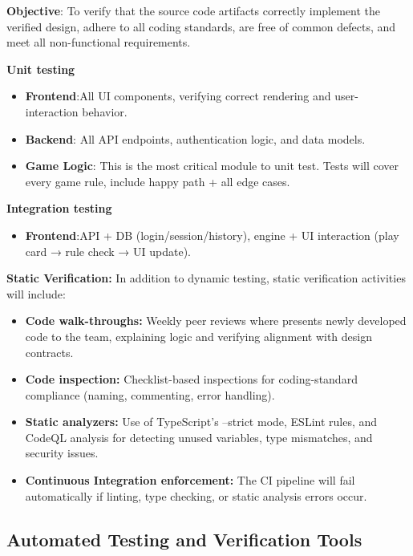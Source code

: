 \documentclass[12pt, titlepage]{article}
\begin{document}
\noindent \textbf{Objective}: To verify that the source code artifacts correctly implement the verified design, adhere to all coding standards, are free of common defects, and meet all non-functional requirements.

\noindent \textbf{Unit testing}
\begin{itemize}
	\item \textbf{Frontend}:All UI components, verifying correct rendering and user-interaction behavior.
	\item \textbf{Backend}: All API endpoints, authentication logic, and data models.
	\item \textbf{Game Logic}: This is the most critical module to unit test. Tests will cover every game rule, include happy path + all edge cases.

\end{itemize}
\noindent \textbf{Integration testing}
\begin{itemize}
	\item \textbf{Frontend}:API + DB (login/session/history), engine + UI interaction (play card → rule check → UI update).
\end{itemize}

\noindent \textbf{Static Verification:}  
    In addition to dynamic testing, static verification activities will include:
    \begin{itemize}
        \item \textbf{Code walk-throughs:} Weekly peer reviews where presents newly developed code to the team, explaining logic and verifying alignment with design contracts.  
        \item \textbf{Code inspection:} Checklist-based inspections for coding-standard compliance (naming, commenting, error handling).  
        \item \textbf{Static analyzers:}  
        Use of TypeScript’s --strict mode, ESLint rules, and CodeQL analysis for detecting unused variables, type mismatches, and security issues.  
        \item \textbf{Continuous Integration enforcement:}  
        The CI pipeline will fail automatically if linting, type checking, or static analysis errors occur.
    \end{itemize}


\subsection{Automated Testing and Verification Tools}
\end{document}
